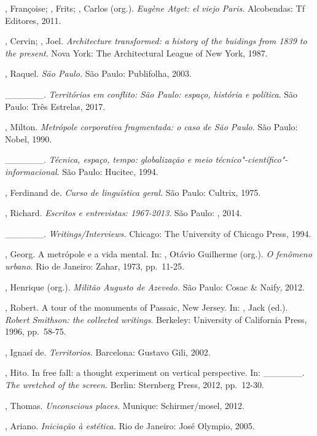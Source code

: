 \begin{Parskip}
, Françoise; , Frits; , Carlos (org.).
\emph{Eugène Atget: el viejo Paris}. Alcobendas: Tf Editores, 2011.

, Cervin; , Joel. \emph{Architecture transformed: a
history of the buidings from 1839 to the present}. Nova York: The
Architectural League of New York, 1987.

, Raquel. \emph{São Paulo.} São Paulo: Publifolha, 2003.

\_\_\_\_\_\_. \emph{Territórios em conflito: São Paulo: espaço,
história e política}. São Paulo: Três Estrelas, 2017.

, Milton. \emph{Metrópole corporativa fragmentada: o caso de
São Paulo}. São Paulo: Nobel, 1990.

\_\_\_\_\_\_. \emph{Técnica, espaço, tempo: globalização e meio
técnico"-científico"-informacional}. São Paulo: Hucitec, 1994.

, Ferdinand de. \emph{Curso de linguística geral.} São Paulo:
Cultrix, 1975.

, Richard. \emph{Escritos e entrevistas: 1967-2013}. São Paulo:
, 2014.

\_\_\_\_\_\_. \emph{Writings/Interviews.} Chicago: The University
of Chicago Press, 1994.

, Georg. A metrópole e a vida mental. In: , Otávio Guilherme
(org.). \emph{O fenômeno urbano.} Rio de Janeiro: Zahar, 1973, pp.~11-25.

, Henrique (org.). \emph{Militão Augusto de Azevedo.} São
Paulo: Cosac \& Naify, 2012.

, Robert. A tour of the monuments of Passaic, New Jersey. In:
, Jack (ed.). \emph{Robert Smithson: the collected writings}.
Berkeley: University of California Press, 1996, pp.~58-75.

, Ignasí de. \emph{Territorios.} Barcelona: Gustavo Gili,
2002.

, Hito. In free fall: a thought experiment on vertical
perspective. In: \_\_\_\_\_\_. \emph{The wretched of the screen.}
Berlin: Sternberg Press, 2012, pp.~12-30.

, Thomas. \emph{Unconscious places.} Munique: Schirmer/mosel, 2012.

, Ariano. \emph{Iniciação à estética.} Rio de Janeiro: José
Olympio, 2005.


\end{Parskip}
